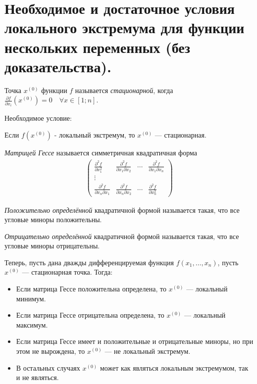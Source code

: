 \documentclass{article}
\begin{document}
\section{Необходимое и достаточное условия локального экстремума для функции нескольких переменных (без доказательства).}
\begin{definition}
	Точка $x^{(0)}$ функции $f$ называется \textit{стационарной}, когда $\frac{\partial f}{\partial x_i}(x^{(0)}) = 0 \quad\forall x \in [1;n]$.
\end{definition}
Необходимое условие:
\begin{theorem}
	Если $f(x^{(0)})$ - локальный экстремум, то $x^{(0)}$ --- стационарная.
\end{theorem}
\begin{definition}
    \textit{Матрицей Гессе} называется симметричная квадратичная форма
    \begin{gather*}
        \begin{pmatrix}
        \frac{\partial^2 f}{\partial x_1^2} & \frac{\partial^2 f}{\partial x_1 \partial x_2} & \cdots & \frac{\partial^2 f}{\partial x_1 \partial x_n}\\
        \vdots\\
        \frac{\partial^2 f}{\partial x_n \partial x_1} & \frac{\partial^2 f}{\partial x_n \partial x_2} & \cdots & \frac{\partial^2 f}{\partial x_n^2}
        \end{pmatrix}
    \end{gather*}
\end{definition}
\begin{definition}
    \textit{Положительно определённой} квадратичной формой называется такая, что все угловые миноры положительны.
\end{definition}
\begin{definition}
    \textit{Отрицательно определённой} квадратичной формой называется такая, что все угловые миноры отрицательны.
\end{definition}
\begin{theorem}
Теперь, пусть дана дважды дифференцируемая функция $f(x_1,\dotsc,x_n)$, пусть $x^{(0)}$ --- стационарная точка.
Тогда:
\begin{itemize}
    \item Если матрица Гессе положительна определена, то $x^{(0)}$ --- локальный минимум.
    \item Если матрица Гессе отрицательна определена, то $x^{(0)}$ --- локальный максимум.
    \item Если матрица Гессе имеет и положительные и отрицательные миноры, но при этом не вырождена, то $x^{(0)}$ --- не локальный экстремум.
    \item В остальных случаях $x^{(0)}$  может как являться локальным экстремумом, так и не являться.
\end{itemize}
\end{theorem}
\end{document}
